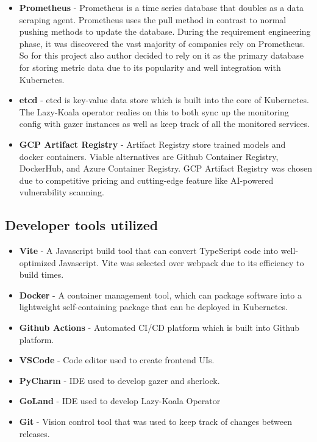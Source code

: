 \begin{itemize}
    \item \textbf{Prometheus} - Prometheus is a time series database that doubles as a data scraping agent. Prometheus uses the pull method in contrast to normal pushing methods to update the database. During the requirement engineering phase, it was discovered the vast majority of companies rely on Prometheus. So for this project also author decided to rely on it as the primary database for storing metric data due to its popularity and well integration with Kubernetes.
    \item \textbf{etcd} - etcd is key-value data store which is built into the core of Kubernetes. The Lazy-Koala operator realies on this to both sync up the monitoring config with gazer instances as well as keep track of all the monitored services.
    \item \textbf{GCP Artifact Registry} - Artifact Registry store trained models and docker containers. Viable alternatives are Github Container Registry, DockerHub, and Azure Container Registry. GCP Artifact Registry was chosen due to competitive pricing and cutting-edge feature like AI-powered vulnerability scanning. 
\end{itemize}

\subsection{Developer tools utilized}
\begin{itemize}
    \item \textbf{Vite} - A Javascript build tool that can convert TypeScript code into well-optimized Javascript. Vite was selected over webpack due to its efficiency to build times.
    \item \textbf{Docker} - A container management tool, which can package software into a lightweight self-containing package that can be deployed in Kubernetes.
    \item \textbf{Github Actions} - Automated CI/CD platform which is built into Github platform.
    \item \textbf{VSCode} - Code editor used to create frontend UIs.
    \item \textbf{PyCharm} - IDE used to develop gazer and sherlock.
    \item \textbf{GoLand} - IDE used to develop Lazy-Koala Operator
    \item \textbf{Git} - Vision control tool that was used to keep track of changes between releases.
\end{itemize}

